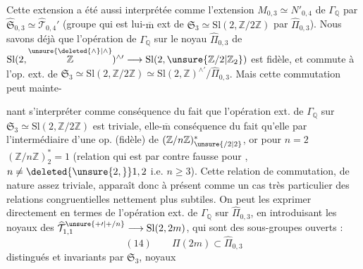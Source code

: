 Cette extension  a été aussi interprétée
comme l'extension $M_{0,3}\simeq N'_{0,4}$ de
$\Gamma_{\mathbb Q}$ par
$\widehat{\mathfrak S}_{0,3}
\simeq\widehat{\mathcal T}_{0,4}'$
(groupe qui est lui-$\overline{\mathrm m}$ ext de
$\mathfrak S_3\simeq\mathrm{Sl}(2,\mathbb Z/2\mathbb Z)$
par $\widehat{\Pi}_{0,3}$).
Nous savons déjà que l'opération  de $\Gamma_{\mathbb Q}$
sur le noyau $\widehat{\Pi}_{0,3}$ de
$\mathrm{Sl}(2,\overset{\unsure{\deleted{\wedge}|\wedge}}{\mathbb Z})^{\wedge\prime}
\longrightarrow\mathrm{Sl}(2,\unsure{\mathbb Z/2|\mathbb Z_{2}})$
est fidèle, et commute à l'op. ext. de
$\mathfrak S_3\simeq\mathrm{Sl}(2,\mathbb Z/2\mathbb Z)
\simeq\mathrm{Sl}(2,\mathbb Z)^{\wedge\prime}/\widehat{\Pi}_{0,3}$.
Mais cette commutation peut mainte-

nant s'interpréter comme conséquence du fait que l'opération ext. de $\Gamma_{\mathbb Q}$ sur $\mathfrak S_3\simeq \mathrm{Sl}(2,\mathbb Z/2\mathbb Z)$ est triviale, elle-$\overline{\mathrm m}$  conséquence du fait qu'elle  par l'intermédiaire d'une op. (fidèle) de $(\mathbb Z/n\mathbb Z)^*_{\unsure{/2|2}}$, or pour $n=2$ $(\mathbb Z/n\mathbb Z)^*_2=1$ (relation qui est par contre fausse pour   , $n\neq\deleted{\unsure{2,}}1,2$ i.e. $n\geq3$). Cette relation de commutation, de nature assez triviale, apparaît donc à présent comme un cas très particulier des relations congruentielles nettement plus subtiles. On peut  les exprimer   directement en termes de l'opération ext. de $\Gamma_{\mathbb Q}$ sur $\widehat\Pi_{0,3}$, en introduisant les noyaux des  $\widehat{\mathcal T}_{1,1}^{\unsure{+\prime|+/n}}\longrightarrow \mathrm{Sl}(2,2m)$, qui sont des sous-groupes  ouverts :
\[
(14)\qquad \Pi(2m)\subset\widehat\Pi_{0,3}
\]
distingués et invariants par $\mathfrak S_3$, noyaux

